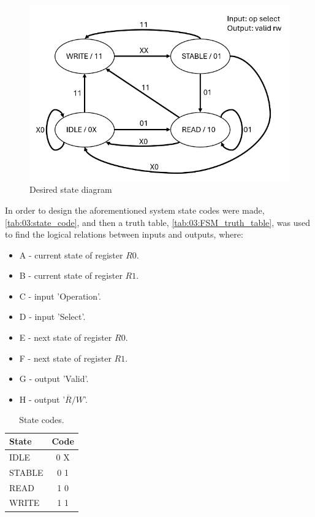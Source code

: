 \begin{figure}[H]
    \centering
    \includegraphics[width=0.6\linewidth]{LaTeX_2/Figures/state_diagram.png}
    \caption{Desired state diagram \cite{oppgavebeskrivelse}}
    \label{fig:03:state_diagram}
\end{figure}

In order to design the aforementioned system state codes were made, \autoref{tab:03:state_code}, and then a truth table, \autoref{tab:03:FSM_truth_table}, was used to find the logical relations between inputs and outputs, where:
\begin{itemize}
    \item A - current state of register $R0$.
    \item B - current state of register $R1$.
    \item C - input 'Operation'.
    \item D - input 'Select'.
    \item E - next state of register $R0$.
    \item F - next state of register $R1$.
    \item G - output 'Valid'.
    \item H - output '$\overline{R}/W$'.
\end{itemize}


\begin{table}[H]
    \caption{State codes.}
    \centering
    \begin{tabular}{|l|c|}
        \hline
        State   &   Code    \\  \hline
        IDLE    &   0 X     \\  
        STABLE  &   0 1     \\
        READ    &   1 0     \\
        WRITE   &   1 1     \\  \hline
    \end{tabular}
    \label{tab:03:state_code}
\end{table}


